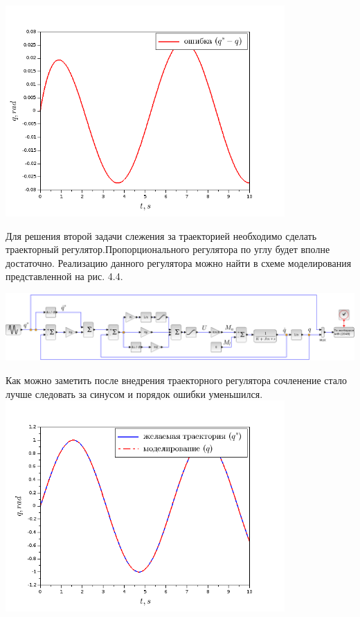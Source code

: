 \begin{center}
    \includegraphics[width=0.8\textwidth]{Lab4/images/Error_without.png}\\
\end{center}
\vspace{1cm}
Для решения второй задачи слежения за траекторией необходимо сделать траекторный регулятор.Пропорционального регулятора по углу будет вполне достаточно. Реализацию данного регулятора можно найти в схеме моделирования представленной на рис. 4.4. \\
\vspace{1cm}
\begin{center}
    \includegraphics[width=\textwidth]{Lab4/images/Scheme_with.png}\\
\end{center}
\begin{center}
Как можно заметить после внедрения траекторного регулятора сочленение стало лучше следовать за синусом и порядок ошибки уменьшился.
    \includegraphics[width=0.8\textwidth]{Lab4/images/Pict_with.png}\\
\end{center}

